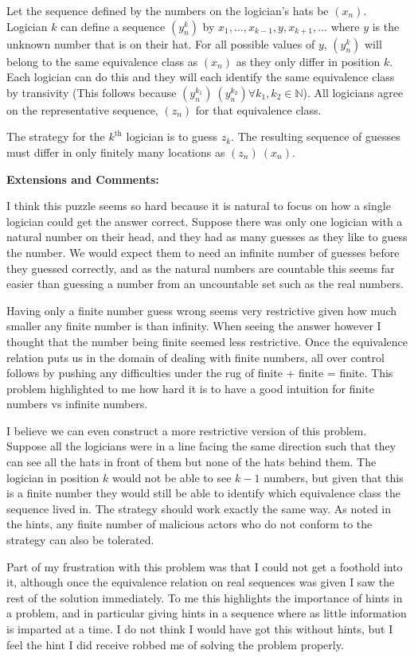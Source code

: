 Let the sequence defined by the numbers on the logician's hats be $(x_n)$. Logician $k$ can define a sequence $(y^k_n)$ by $x_1, \dots, x_{k-1}, y, x_{k+1}, \dots$ where $y$ is the unknown number that is on their hat. For all possible values of $y$, $(y^k_n)$ will belong to the same equivalence class as $(x_n)$ as they only differ in position $k$. Each logician can do this and they will each identify the same equivalence class by transivity (This follows because $(y_n^{k_1}) ~ (y_n^{k_2}) \forall k_1, k_2 \in \mathbb{N}$). All logicians agree on the representative sequence, $(z_n)$ for that equivalence class.

The strategy for the $k^\text{th}$ logician is to guess $z_k$. The resulting sequence of guesses must differ in only finitely many locations as $(z_n) ~ (x_n)$.

\textbf{Extensions and Comments:}

I think this puzzle seems so hard because it is natural to focus on how a single logician could get the answer correct. Suppose there was only one logician with a natural number on their head, and they had as many guesses as they like to guess the number. We would expect them to need an infinite number of guesses before they guessed correctly, and as the natural numbers are countable this seems far easier than guessing a number from an uncountable set such as the real numbers.

Having only a finite number guess wrong seems very restrictive given how much smaller any finite number is than infinity. When seeing the answer however I thought that the number being finite seemed less restrictive. Once the equivalence relation puts us in the domain of dealing with finite numbers, all over control follows by pushing any difficulties under the rug of finite + finite = finite. This problem highlighted to me how hard it is to have a good intuition for finite numbers vs infinite numbers.

I believe we can even construct a more restrictive version of this problem. Suppose all the logicians were in a line facing the same direction such that they can see all the hats in front of them but none of the hats behind them. The logician in position $k$ would not be able to see $k - 1$ numbers, but given that this is a finite number they would still be able to identify which equivalence class the sequence lived in. The strategy should work exactly the same way. As noted in the hints, any finite number of malicious actors who do not conform to the strategy can also be tolerated.

Part of my frustration with this problem was that I could not get a foothold into it, although once the equivalence relation on real sequences was given I saw the rest of the solution immediately. To me this highlights the importance of hints in a problem, and in particular giving hints in a sequence where as little information is imparted at a time. I do not think I would have got this without hints, but I feel the hint I did receive robbed me of solving the problem properly.